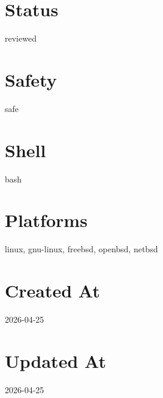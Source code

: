 \documentclass{article}
\begin{document}
\section*{Status}
reviewed

\section*{Safety}
safe

\section*{Shell}
bash

\section*{Platforms}
linux, gnu-linux, freebsd, openbsd, netbsd

\section*{Created At}
2026-04-25

\section*{Updated At}
2026-04-25
\end{document}
